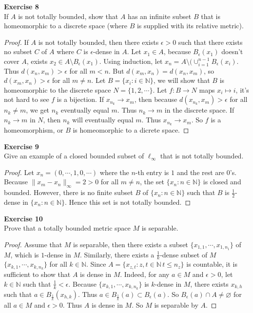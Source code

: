 \documentclass[12pt, a4paper]{article}
\theoremstyle{plain}
\newcommand{\N}{\mathbb{N}}
\newenvironment{exercise}[2][Exercise]
    { \begin{mdframed}[backgroundcolor=gray!20] \textbf{#1 #2} \\}
    {  \end{mdframed}}
\begin{document}
\pagebreak

\begin{exercise}{8}
If $A$ is not totally bounded, show that $A$ has an infinite subset $B$ that is homeomorphic to a discrete space (where $B$ is supplied with its relative metric).
\end{exercise}
	\begin{proof}
	If $A$ is not totally bounded, then there exists $\epsilon>0$ such that there exists no subset $C$ of $A$ where $C$ is $\epsilon$-dense in $A$. Let $x_1\in A$, because $B_\epsilon(x_1)$ doesn't cover $A$, exists $x_2\in A\setminus B_\epsilon(x_1)$. Using induction, let $x_n=A\setminus (\cup_{i=1}^{n-1}{B_\epsilon(x_i)}$. Thus $d(x_n,x_m)>\epsilon$ for all $m<n$. But $d(x_m,x_n)=d(x_n,x_m)$, so $d(x_m,x_n)>\epsilon$ for all $m\neq n$. Let $B=\{x_i:i\in\N\}$, we will show that $B$ is homeomorphic to the discrete space $N=\{1,2,\cdots\}$. Let $f:B\rightarrow N$ maps $x_i\mapsto i$, it's not hard to see $f$ is a bijection. If $x_{n_k}\rightarrow x_{m}$, then because $d(x_{n_k},x_m)>\epsilon$ for all $n_k\neq m$, we get $n_k$ eventually equal $m$. Thus $n_k\rightarrow m$ in the discrete space. If $n_k\rightarrow m$ in $N$, then $n_k$ will eventually equal $m$. Thus $x_{n_k}\rightarrow x_m$. So $f$ is a homeomorphism, or $B$ is homeomorphic to a dicrete space.
	\end{proof}

\begin{exercise}{9}
Give an example of a closed bounded subset of $\ell_\infty$ that is not totally bounded.
\end{exercise}
	\begin{proof}
	Let $x_n=(0,\cdots,1,0,\cdots)$ where the $n$-th entry is $1$ and the rest are $0$'s. Because $\|x_m-x_n\|_\infty=2>0$ for all $m\neq n$, the set $\{x_n:n\in\N\}$ is closed and bounded. However, there is no finite subset $B$ of $\{x_n:n\in\N\}$ such that $B$ is $\frac{1}{2}$-dense in $\{x_n:n\in\N\}$. Hence this set is not totally bounded.
	\end{proof}

\begin{exercise}{10}
Prove that a totally bounded metric space $M$ is separable.
\end{exercise}
	\begin{proof}
	Assume that $M$ is separable, then there exists a subset $\{x_{1,1},\cdots,x_{1,n_1}\}$ of $M$, which is $1$-dense in $M$. Similarly, there exists a $\frac{1}{k}$-dense subset of $M$ $\{x_{k,1},\cdots,x_{k,n_k}\}$ for all $k\in \N$. Since $A=\{x_{z,t}:z,t\in \N\, t\leq n_z\}$ is countable, it is sufficient to show that $A$ is dense in $M$. Indeed, for any $a\in M$ and $\epsilon>0$, let $k\in\N$ such that $\frac{1}{k}<\epsilon$. Because $\{x_{k,1},\cdots,x_{k,n_k}\}$ is $k$-dense in $M$, there exists $x_{k,h}$ such that $a\in B_\frac{1}{k}(x_{h,k})$. Thus $a\in B_\frac{1}{k}(a)\subset B_\epsilon(a)$. So $B_\epsilon(a)\cap A\neq \varnothing$ for all $a\in M$ and $\epsilon>0$. Thus $A$ is dense in $M$. So $M$ is separable by $A$.
	\end{proof}
\end{document}

